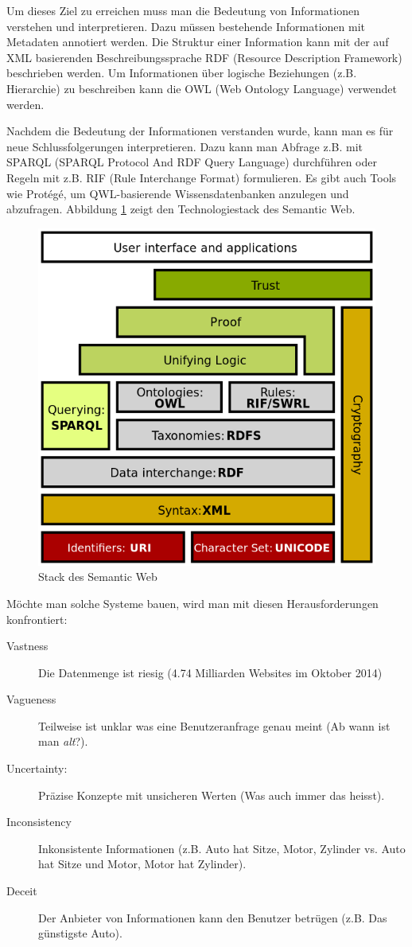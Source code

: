 Um dieses Ziel zu erreichen muss man die Bedeutung von Informationen verstehen und interpretieren. Dazu müssen bestehende Informationen mit Metadaten annotiert werden. Die Struktur einer Information kann mit der auf XML basierenden Beschreibungssprache RDF (Resource Description Framework) beschrieben werden. Um Informationen über logische Beziehungen (z.B. Hierarchie) zu beschreiben kann die OWL (Web Ontology Language) verwendet werden.

Nachdem die Bedeutung der Informationen verstanden wurde, kann man es für neue Schlussfolgerungen interpretieren. Dazu kann man Abfrage z.B. mit SPARQL (SPARQL Protocol And RDF Query Language) durchführen oder Regeln mit z.B. RIF (Rule Interchange Format) formulieren. Es gibt auch Tools wie Protégé, um QWL-basierende Wissensdatenbanken anzulegen und abzufragen. Abbildung \ref{fig:semantic-webstack} zeigt den Technologiestack des Semantic Web.
\begin{figure}
\centering
\includegraphics[width=0.5\linewidth]{fig/semantic-webstack}
\caption{Stack des Semantic Web}
\label{fig:semantic-webstack}
\end{figure}
Möchte man solche Systeme bauen, wird man mit diesen Herausforderungen konfrontiert:
\begin{description}
	\item[Vastness] Die Datenmenge ist riesig (4.74 Milliarden Websites im Oktober 2014)
	\item[Vagueness] Teilweise ist unklar was eine Benutzeranfrage genau meint (Ab wann ist man \textit{alt}?).
	\item[Uncertainty:] Präzise Konzepte mit unsicheren Werten (Was auch immer das heisst).
	\item[Inconsistency] Inkonsistente Informationen (z.B. Auto hat Sitze, Motor, Zylinder vs. Auto hat Sitze und Motor, Motor hat Zylinder).
	\item[Deceit] Der Anbieter von Informationen kann den Benutzer betrügen (z.B. Das günstigste Auto).
\end{description}
